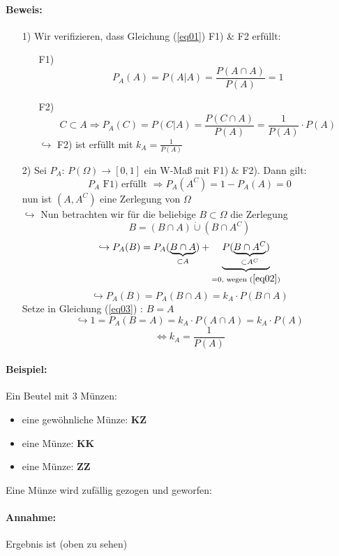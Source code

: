 \documentclass[12pt,a4paper]{article}
\begin{document}
 	\paragraph{Beweis:}
 	\begin{itemize}
 		\item[1)] Wir verifizieren, dass Gleichung (\ref{eq01}) F1) \& F2 erfüllt:
 		\begin{itemize}
 			\item[F1)] $$P_A (A)=P(A|A)=\frac{P(A\cap A)}{P(A)}=1$$
 			\item[F2)] $$C\subset A\Rightarrow P_A(C)=P(C|A)=\frac{P(C\cap A)}{P(A)}=
 			\frac{1}{P(A)}\cdot P(A)$$
 			$\hookrightarrow$ F2) ist erfüllt mit $k_A = \frac{1}{P(A)}$ 
		\end{itemize}
		\item[2)] Sei $P_A$: $P(\Omega)\rightarrow[0,1]$ ein W-Maß mit F1) \& F2). Dann gilt:
		\begin{equation}
		\label{eq02}
		P_A \text{ F1) erfüllt }\Rightarrow P_A(A^C) = 1-P_A (A)=0
		\end{equation}
		nun ist $(A,A^C)$ eine Zerlegung von $\Omega$\\
		$\hookrightarrow$ Nun betrachten wir für die beliebige $B\subset \Omega$ die Zerlegung
		$$B=(B\cap A)\dot{\cup} (B\cap A^C)$$
		$$\hookrightarrow P_A (B)=P_A (\underbrace{B\cap A}_{\subset A}) + 
\underbrace{P(\underbrace{B\cap A^C}_{\subset A^C})}_{=0, \text{ wegen }(\ref{eq02})}$$
		\begin{equation}
		\label{eq03}
		\hookrightarrow P_A(B)=P_A(B\cap A) = k_A\cdot P(B\cap A)
		\end{equation}
		Setze in Gleichung (\ref{eq03}) : $B=A$
		$$\hookrightarrow 1=P_A (B=A)=k_A\cdot P(A\cap A)= k_A \cdot P(A)$$
		$$\Leftrightarrow k_A = \frac{1}{P(A)}$$	   		 
 	\end{itemize}
 	
 	\paragraph{Beispiel:} 
 	Ein Beutel mit 3 Münzen:
 	\begin{itemize}
 		\item eine gewöhnliche Münze: \textbf{KZ}
 		\item eine Münze: \textbf{KK}
 		\item eine Münze: \textbf{ZZ}
 	\end{itemize}
	Eine Münze wird zufällig gezogen und geworfen:
	
	\paragraph{Annahme:} 
	Ergebnis ist  (oben zu sehen)
	
\end{document}
